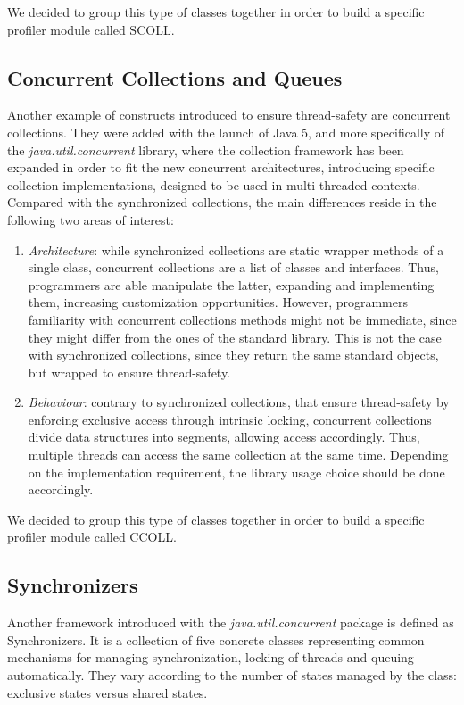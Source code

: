 \documentclass[]{usiinfthesis}
\begin{document}
\noindent
We decided to group this type of classes together in order to build a specific profiler module called SCOLL.

\subsection{Concurrent Collections and Queues}
Another example of constructs introduced to ensure thread-safety are concurrent collections. They were added with the launch of Java 5, and more specifically of the \textit{java.util.concurrent} library, where the collection framework has been expanded in order to fit the new concurrent architectures, introducing specific collection implementations, designed to be used in multi-threaded contexts. Compared with the synchronized collections, the main differences reside in the following two areas of interest:
\begin{enumerate}
    \item \textit{Architecture}: while synchronized collections are static wrapper methods of a single class, concurrent collections are a list of classes and interfaces. Thus, programmers are able manipulate the latter, expanding and implementing them, increasing customization opportunities. However, programmers familiarity with concurrent collections methods might not be immediate, since they might differ from the ones of the standard library. This is not the case with synchronized collections, since they return the same standard objects, but wrapped to ensure thread-safety.  
    \item \textit{Behaviour}: contrary to synchronized collections, that ensure thread-safety by enforcing exclusive access through intrinsic locking, concurrent collections divide data structures into segments, allowing access accordingly. Thus, multiple threads can access the same collection at the same time. Depending on the implementation requirement, the library usage choice should be done accordingly.
\end{enumerate}

\noindent
We decided to group this type of classes together in order to build a specific profiler module called CCOLL.


\subsection{Synchronizers}
Another framework introduced with the \textit{java.util.concurrent} package is defined as Synchronizers. It is a collection of five concrete classes representing common mechanisms for managing synchronization, locking of threads and queuing automatically. They vary according to the number of states managed by the class: exclusive states versus shared states.
\end{document}
